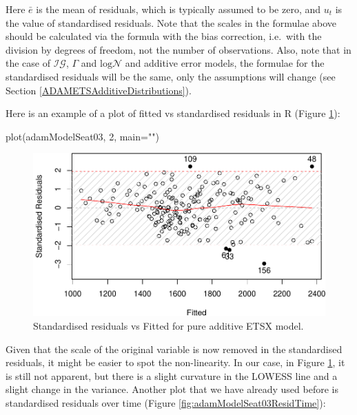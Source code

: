 \documentclass[
]{book}
\newenvironment{Shaded}{\begin{snugshade}}{\end{snugshade}}
\newcommand{\AttributeTok}[1]{\textcolor[rgb]{0.77,0.63,0.00}{#1}}
\newcommand{\DecValTok}[1]{\textcolor[rgb]{0.00,0.00,0.81}{#1}}
\newcommand{\FunctionTok}[1]{\textcolor[rgb]{0.00,0.00,0.00}{#1}}
\newcommand{\NormalTok}[1]{#1}
\newcommand{\StringTok}[1]{\textcolor[rgb]{0.31,0.60,0.02}{#1}}
\theoremstyle{definition}
\theoremstyle{definition}
\theoremstyle{definition}
\theoremstyle{definition}
\theoremstyle{remark}
\begin{document}
Here \(\bar{e}\) is the mean of residuals, which is typically assumed to be zero, and \(u_t\) is the value of standardised residuals. Note that the scales in the formulae above should be calculated via the formula with the bias correction, i.e.~with the division by degrees of freedom, not the number of observations. Also, note that in the case of \(\mathcal{IG}\), \(\Gamma\) and \(\mathrm{log}\mathcal{N}\) and additive error models, the formulae for the standardised residuals will be the same, only the assumptions will change (see Section \ref{ADAMETSAdditiveDistributions}).

Here is an example of a plot of fitted vs standardised residuals in R (Figure \ref{fig:adamModelSeat03Resid}):

\begin{Shaded}
\begin{Highlighting}[]
\FunctionTok{plot}\NormalTok{(adamModelSeat03, }\DecValTok{2}\NormalTok{, }\AttributeTok{main=}\StringTok{""}\NormalTok{)}
\end{Highlighting}
\end{Shaded}

\begin{figure}
\centering
\includegraphics{Svetunkov--2022----ADAM_files/figure-latex/adamModelSeat03Resid-1.pdf}
\caption{\label{fig:adamModelSeat03Resid}Standardised residuals vs Fitted for pure additive ETSX model.}
\end{figure}

Given that the scale of the original variable is now removed in the standardised residuals, it might be easier to spot the non-linearity. In our case, in Figure \ref{fig:adamModelSeat03Resid}, it is still not apparent, but there is a slight curvature in the LOWESS line and a slight change in the variance. Another plot that we have already used before is standardised residuals over time (Figure \ref{fig:adamModelSeat03ResidTime}):
\end{document}
